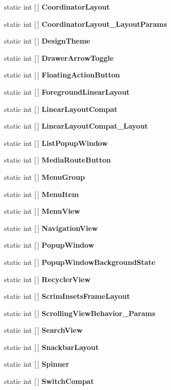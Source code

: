 \begin{DoxyCompactItemize}
\item 
static int \mbox{[}$\,$\mbox{]} {\bfseries Coordinator\+Layout}
\item 
static int \mbox{[}$\,$\mbox{]} {\bfseries Coordinator\+Layout\+\_\+\+Layout\+Params}
\item 
static int \mbox{[}$\,$\mbox{]} {\bfseries Design\+Theme}
\item 
static int \mbox{[}$\,$\mbox{]} {\bfseries Drawer\+Arrow\+Toggle}
\item 
static int \mbox{[}$\,$\mbox{]} {\bfseries Floating\+Action\+Button}
\item 
static int \mbox{[}$\,$\mbox{]} {\bfseries Foreground\+Linear\+Layout}
\item 
static int \mbox{[}$\,$\mbox{]} {\bfseries Linear\+Layout\+Compat}
\item 
static int \mbox{[}$\,$\mbox{]} {\bfseries Linear\+Layout\+Compat\+\_\+\+Layout}
\item 
static int \mbox{[}$\,$\mbox{]} {\bfseries List\+Popup\+Window}
\item 
static int \mbox{[}$\,$\mbox{]} {\bfseries Media\+Route\+Button}
\item 
static int \mbox{[}$\,$\mbox{]} {\bfseries Menu\+Group}
\item 
static int \mbox{[}$\,$\mbox{]} {\bfseries Menu\+Item}
\item 
static int \mbox{[}$\,$\mbox{]} {\bfseries Menu\+View}
\item 
static int \mbox{[}$\,$\mbox{]} {\bfseries Navigation\+View}
\item 
static int \mbox{[}$\,$\mbox{]} {\bfseries Popup\+Window}
\item 
static int \mbox{[}$\,$\mbox{]} {\bfseries Popup\+Window\+Background\+State}
\item 
static int \mbox{[}$\,$\mbox{]} {\bfseries Recycler\+View}
\item 
static int \mbox{[}$\,$\mbox{]} {\bfseries Scrim\+Insets\+Frame\+Layout}
\item 
static int \mbox{[}$\,$\mbox{]} {\bfseries Scrolling\+View\+Behavior\+\_\+\+Params}
\item 
static int \mbox{[}$\,$\mbox{]} {\bfseries Search\+View}
\item 
static int \mbox{[}$\,$\mbox{]} {\bfseries Snackbar\+Layout}
\item 
static int \mbox{[}$\,$\mbox{]} {\bfseries Spinner}
\item 
static int \mbox{[}$\,$\mbox{]} {\bfseries Switch\+Compat}
\item 

\end{DoxyCompactItemize}

